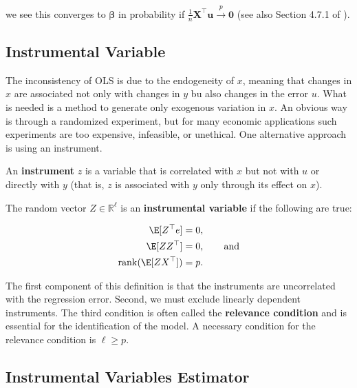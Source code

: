 \begin{itemize}
we see this converges to \(\boldsymbol{\beta}\) in probability if  \(\frac{1}{n} \boldsymbol{X}^\top \boldsymbol{u} \xrightarrow{p} \boldsymbol{0}\) (see also Section 4.7.1 of \citet{cameron_trivedi_2005}). 

\end{itemize}


\subsection{Instrumental Variable}\label{economet.sec.iv}

The inconsistency of OLS is due to the endogeneity of \(x\), meaning that changes in \(x\) are associated not only with changes in \(y\) bu also changes in the error \(u\). What is needed is a method to generate only exogenous variation in \(x\). An obvious way is through a randomized experiment, but for many economic applications such experiments are too expensive, infeasible, or unethical. One alternative approach is using an instrument.

An \textbf{instrument} \(z\) is a variable that is correlated with \(x\) but not with \(u\) or directly with \(y\) (that is, \(z\) is associated with \(y\) only through its effect on \(x\)).

\begin{definition}

The random vector \(Z \in \mathbb{R}^\ell\) is an \textbf{instrumental variable} if the following are true:

\begin{align*}
\E[Z^\top e] & = 0, \\
\E[Z Z^\top] & = 0, \qquad \text{and} \\
\operatorname{rank}(\E[Z X^\top]) & = p.
\end{align*}

\end{definition}

The first component of this definition is that the instruments are uncorrelated with the regression error. Second, we must exclude linearly dependent instruments. The third condition is often called the \textbf{relevance condition} and is essential for the identification of the model. A necessary condition for the relevance condition is \(\ell \geq p\).

\subsection{Instrumental Variables Estimator}


